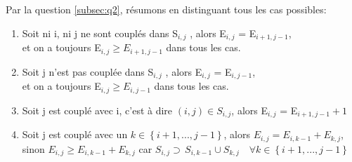 \documentclass[french]{article}
\begin{document}
\subsection{}
\label{subsec:q3}
	\subsubsection{}

		Par la question \ref{subsec:q2}, résumons en distinguant tous les cas possibles:
\\
		\begin{enumerate}  
		\item \label{itm:1}
			 Soit ni i, ni j ne sont couplés dans S$_{i,j}$ , alors E$_{i,j}$ = E$_{i+1,j-1}$, \\
			et on a toujours E$_{i,j} \geq E_{i+1,j-1}$ dans tous les cas.
		\item Soit j n'est pas couplée dans S$_{i,j}$ , alors  E$_{i,j}$ = E$_{i,j-1}$, \\
			et on a toujours E$_{i,j} \geq E_{i,j-1}$ dans tous les cas.
		\item Soit j est couplé avec i, c'est à dire $\left(i,j\right)\in S_{i,j}$, alors E$_{i,j}$  = E$_{i+1,j-1}+1$
		\item Soit j est couplé avec un $k\in\left\{ i+1,...,j-1\right\} $, alors $E_{i,j} = E_{i,k-1} + E_{k,j}$,\\ sinon $E_{i,j} \geq E_{i,k-1} + E_{k,j}$ car $S_{i,j} \supset \, S_{i,k-1}\cup S_{k,j}\quad \forall k \in\left\{ i+1,...,j-1\right\}$
		\end{enumerate}
		
\end{document}
